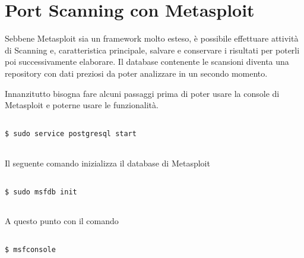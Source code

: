 \documentclass[14pt]{extreport}
\begin{document}
\section{Port Scanning con Metasploit}
Sebbene Metasploit sia un framework molto esteso, è possibile effettuare attività di Scanning e, caratteristica principale, salvare e conservare i risultati per poterli poi successivamente elaborare. Il database contenente le scansioni diventa una repository con dati preziosi da poter analizzare in un secondo momento.

Innanzitutto bisogna fare alcuni passaggi prima di poter usare la console di Metasploit e poterne usare le funzionalità.


\vspace{5pt}

{
\small
\begin{tcolorbox}

\begin{verbatim}

$ sudo service postgresql start
  
\end{verbatim}

\end{tcolorbox}
}

\vspace{5pt}



Il seguente comando inizializza il database di Metasploit

\vspace{5pt}

{
\small
\begin{tcolorbox}

\begin{verbatim}

$ sudo msfdb init
  
\end{verbatim}

\end{tcolorbox}
}

\vspace{5pt}

A questo punto con il comando



\vspace{5pt}

{
\small
\begin{tcolorbox}

\begin{verbatim}

$ msfconsole
  
\end{verbatim}

\end{tcolorbox}
}
\end{document}
